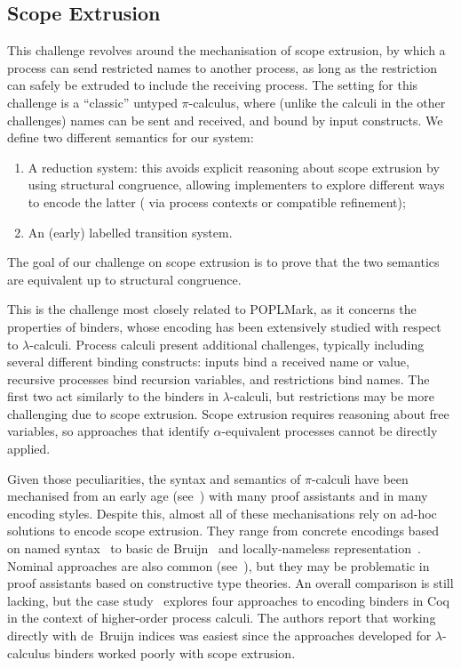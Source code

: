\documentclass[runningheads]{llncs}
\begin{document}
\subsection{Scope Extrusion}
This challenge revolves around the mechanisation of scope
extrusion, by which a process can send restricted names to another
process, as long as the restriction can safely be extruded to include
the receiving process.  The setting for this challenge is a
``classic'' untyped \( \pi \)-calculus, where (unlike the calculi in
the other challenges) names can be sent and received, and bound by
input constructs.  We define two different semantics for our system:
\begin{enumerate}
\item A reduction system: this avoids explicit reasoning about scope
  extrusion by using structural congruence, allowing
  implementers to explore different ways to encode the latter (\eg
  via process contexts or compatible refinement);
\item An (early) labelled transition system.
\end{enumerate}
The goal of our challenge on scope extrusion is to prove that the two semantics are
equivalent up to structural congruence.

This is the challenge most closely related to POPLMark,
as it concerns the properties of binders, whose encoding has been
extensively studied with respect to $\lambda$-calculi. Process calculi
present additional challenges, typically including several
different binding constructs: inputs bind a received name or value,
recursive processes bind recursion variables, and restrictions bind
names. The first two act similarly to the binders in
$\lambda$-calculi, but restrictions may be more challenging due to
scope extrusion.
Scope extrusion requires reasoning about free variables, so approaches that identify \(\alpha\)-equivalent processes cannot be directly applied.

Given those peculiarities, the syntax and semantics of $\pi$-calculi
have been mechanised from an early age (see~\cite{Melham1994}) with
many proof assistants and in many encoding styles.  Despite this,
almost all of these mechanisations rely on ad-hoc solutions to encode
scope extrusion.  They range from concrete encodings based on named
syntax~\cite{Melham1994} to basic de Bruijn~\cite{Hirschkoff1997,
  Perera2018} and locally-nameless representation~\cite{Castro2020}.
Nominal approaches are also common (see~\cite{Bengtson2009}), but they
may be problematic in proof assistants based on constructive type
theories.  An overall comparison is still lacking, but the case
study~\cite{AmbalLS21} explores four approaches to encoding binders in
Coq in the context of higher-order process calculi.  The authors report that working directly
with de~Bruijn indices was easiest since the approaches
developed for $\lambda$-calculus binders worked poorly with scope
extrusion.
\end{document}

